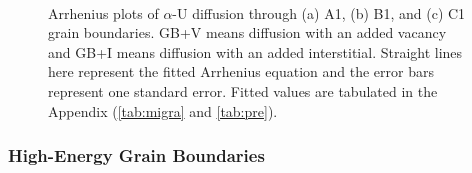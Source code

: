 \documentclass[review]{elsarticle}
\providecommand{\DIFaddbeginFL}{} %
\providecommand{\DIFaddendFL}{} %
\providecommand{\DIFdelbeginFL}{} %
\providecommand{\DIFdelendFL}{} %
\newcommand{\DIFscaledelfig}{0.5}
\newlength{\DIFdelgraphicswidth} %
\newlength{\DIFdelgraphicsheight} %
\newcommand{\DIFaddincludegraphics}[2][]{{\color{blue}\fbox{\DIFOincludegraphics[#1]{#2}}}} %
\newcommand{\DIFdelincludegraphics}[2][]{%
\sbox{\DIFdelgraphicsbox}{\DIFOincludegraphics[#1]{#2}}%
\settoboxwidth{\DIFdelgraphicswidth}{\DIFdelgraphicsbox} %
\settoboxtotalheight{\DIFdelgraphicsheight}{\DIFdelgraphicsbox} %
\scalebox{\DIFscaledelfig}{%
\parbox[b]{\DIFdelgraphicswidth}{\usebox{\DIFdelgraphicsbox}\\[-\baselineskip] \rule{\DIFdelgraphicswidth}{0em}}\llap{\resizebox{\DIFdelgraphicswidth}{\DIFdelgraphicsheight}{%
\setlength{\unitlength}{\DIFdelgraphicswidth}%
\begin{picture}(1,1)%
\thicklines\linethickness{2pt} %
{\color[rgb]{1,0,0}\put(0,0){\framebox(1,1){}}}%
{\color[rgb]{1,0,0}\put(0,0){\line( 1,1){1}}}%
{\color[rgb]{1,0,0}\put(0,1){\line(1,-1){1}}}%
\end{picture}%
}\hspace*{3pt}}} %
} %
\DeclareRobustCommand{\DIFaddbeginFL}{\DIFOaddbeginFL \let\includegraphics\DIFaddincludegraphics} %
\DeclareRobustCommand{\DIFaddendFL}{\DIFOaddendFL \let\includegraphics\DIFOincludegraphics} %
\DeclareRobustCommand{\DIFdelbeginFL}{\DIFOdelbeginFL \let\includegraphics\DIFdelincludegraphics} %
\DeclareRobustCommand{\DIFdelendFL}{\DIFOaddendFL \let\includegraphics\DIFOincludegraphics} %
\begin{document}
\begin{figure}[h!]
\centering
\DIFdelbeginFL %
\DIFdelendFL \DIFaddbeginFL {}
\DIFaddendFL \\
\caption{Arrhenius plots of $\alpha$-U diffusion through (a) A1, (b) B1, and (c) C1 grain boundaries. GB+V means diffusion with an added vacancy and GB+I means diffusion with an added interstitial. Straight lines here represent the fitted Arrhenius equation and the error bars represent one standard error. Fitted values are tabulated in the Appendix (\ref{tab:migra} and \ref{tab:pre}).}
\label{fig:Dif_fit1}
\end{figure}

\subsubsection{High-Energy Grain Boundaries}
\end{document}
